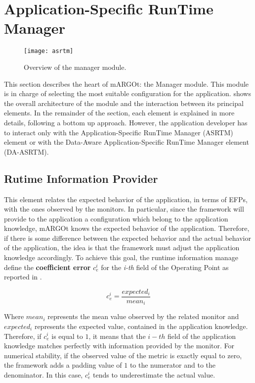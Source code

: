 \section{Application-Specific RunTime Manager}
\label{sec:asrtm}


\begin{figure}
	\centering
	\texttt{[image: asrtm]}
	\caption{Overview of the manager module. }
	\label{fig:asrtm_module}
\end{figure}


This section describes the heart of mARGOt: the Manager module.
This module is in charge of selecting the most suitable configuration for the application.
 shows the overall architecture of the module and the interaction between its principal elements.
In the remainder of the section, each element is explained in more details, following a bottom up approach.
However, the application developer has to interact only with the Application-Specific RunTime Manager (ASRTM) element or with the Data-Aware Application-Specific RunTime Manager element (DA-ASRTM).





\subsection{Rutime Information Provider}

This element relates the expected behavior of the application, in terms of EFPs, with the ones observed by the monitors.
In particular, since the framework will provide to the application a configuration which belong to the application knowledge, mARGOt knows the expected behavior of the application.
Therefore, if there is some difference between the expected behavior and the actual behavior of the application, the idea is that the framework must adjust the application knowledge accordingly.
To achieve this goal, the runtime information manage define the \textbf{coefficient error} $c_{e}^{i}$ for the \textit{i-th} field of the Operating Point as reported in .

\begin{equation}
\label{eq:coefficient_error}
c_{e}^{i}=\dfrac{expected_{i}}{mean_{i}}
\end{equation}

Where $mean_{i}$ represents the mean value observed by the related monitor and $expected_{i}$ represents the expected value, contained in the application knowledge.
Therefore, if $c_{e}^{i}$ is equal to $1$, it means that the $i-th$ field of the application knowledge matches perfectly with information provided by the monitor.
For numerical stability, if the observed value of the metric is exactly equal to zero, the framework adds a padding value of $1$ to the numerator and to the denominator.
In this case, $c_{e}^{i}$ tends to underestimate the actual value.

